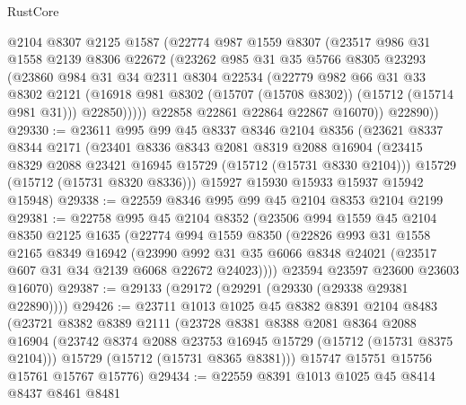 \begin{lexlean}{RustCore}
\begin{coremodule}
            @2104
            @8307
            @2125
            @1587
            (@22774
              @987
              @1559
              @8307
              (@23517
                @986
                @31
                @1558
                @2139
                @8306
                @22672
                (@23262
                  @985
                  @31
                  @35
                  @5766
                  @8305
                  @23293
                  (@23860
                    @984
                    @31
                    @34
                    @2311
                    @8304
                    @22534
                    (@22779
                      @982
                      @66
                      @31
                      @33
                      @8302
                      @2121
                      (@16918 @981 @8302 (@15707 (@15708 @8302)) (@15712 (@15714 @981 @31)))
                      @22850)))))
            @22858
            @22861
            @22864
            @22867
            @16070))
        @22890))
@29330 := @23611
    @995
    @99
    @45
    @8337
    @8346
    @2104
    @8356
    (@23621
      @8337
      @8344
      @2171
      (@23401
        @8336
        @8343
        @2081
        @8319
        @2088
        @16904
        (@23415 @8329 @2088 @23421 @16945 @15729 (@15712 (@15731 @8330 @2104)))
        @15729
        (@15712 (@15731 @8320 @8336)))
      @15927
      @15930
      @15933
      @15937
      @15942
      @15948)
@29338 := @22559 @8346 @995 @99 @45 @2104 @8353 @2104 @2199
@29381 := @22758
    @995
    @45
    @2104
    @8352
    (@23506
      @994
      @1559
      @45
      @2104
      @8350
      @2125
      @1635
      (@22774
        @994
        @1559
        @8350
        (@22826
          @993
          @31
          @1558
          @2165
          @8349
          @16942
          (@23990 @992 @31 @35 @6066 @8348 @24021 (@23517 @607 @31 @34 @2139 @6068 @22672 @24023))))
      @23594
      @23597
      @23600
      @23603
      @16070)
@29387 := @29133 (@29172 (@29291 (@29330 (@29338 @29381 @22890))))
@29426 := @23711
    @1013
    @1025
    @45
    @8382
    @8391
    @2104
    @8483
    (@23721
      @8382
      @8389
      @2111
      (@23728
        @8381
        @8388
        @2081
        @8364
        @2088
        @16904
        (@23742 @8374 @2088 @23753 @16945 @15729 (@15712 (@15731 @8375 @2104)))
        @15729
        (@15712 (@15731 @8365 @8381)))
      @15747
      @15751
      @15756
      @15761
      @15767
      @15776)
@29434 := @22559 @8391 @1013 @1025 @45 @8414 @8437 @8461 @8481

\end{coremodule}
\end{lexlean}
